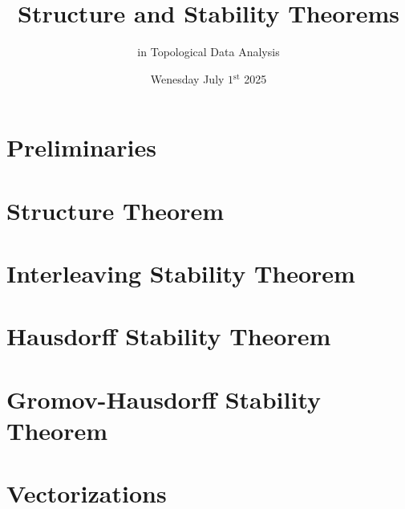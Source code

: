 \documentclass[aspectratio=169]{beamer}
\title{Structure and Stability Theorems}
\subtitle{in Topological Data Analysis}
\author{\authorname}
\date{Wenesday July $1{^{\text{st}}}$ 2025}
\begin{document}
\frame{\titlepage}


\section{Preliminaries}

\section{Structure Theorem}

\section{Interleaving Stability Theorem}

\section{Hausdorff Stability Theorem}

\section{Gromov-Hausdorff Stability Theorem}

\section{Vectorizations}
\end{document}
